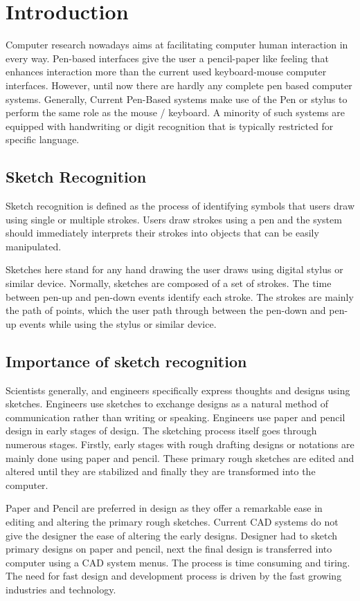 \chapter {Introduction}
Computer research nowadays aims at facilitating computer human interaction in every way. Pen-based interfaces give the user a pencil-paper like feeling that enhances interaction more than the current used keyboard-mouse computer interfaces. However, until now there are hardly any complete pen based computer systems. Generally, Current Pen-Based systems make use of the Pen or stylus to perform the same role as the mouse / keyboard. A minority of such systems are equipped with handwriting or digit recognition that is typically restricted for specific language. 

\section{Sketch Recognition}
Sketch recognition is defined as the process of identifying symbols that users draw using single or multiple strokes. Users draw strokes using a pen and the system should immediately interprets their strokes into objects that can be easily manipulated.

Sketches here stand for any hand drawing the user draws using digital stylus or similar device. Normally, sketches are composed of a set of strokes. The time between pen-up and pen-down events identify each stroke. The strokes are mainly the path of points, which the user path through between the pen-down and pen-up events while using the stylus or similar device. 
  
\section{Importance of sketch recognition}
\label{sec:ImportanceOfSketchRecognition}
Scientists generally, and engineers specifically express thoughts and designs using sketches. Engineers use sketches to exchange designs as a natural method of communication rather than writing or speaking. Engineers use paper and pencil design in early stages of design. The sketching process itself goes through  numerous stages. Firstly, early stages with rough drafting designs or notations are mainly done using paper and pencil. These primary rough sketches are edited and altered until they are stabilized and finally they are transformed into the computer. 

 Paper and Pencil are preferred in design as they offer a remarkable ease in editing and altering the primary rough sketches. Current CAD systems do not give the designer the ease of altering the early designs. Designer had to sketch primary designs on paper and pencil, next the final design is transferred into computer using a CAD system menus. The process is time consuming and tiring. The need for fast design and development process is driven by the fast growing industries and technology.
 
